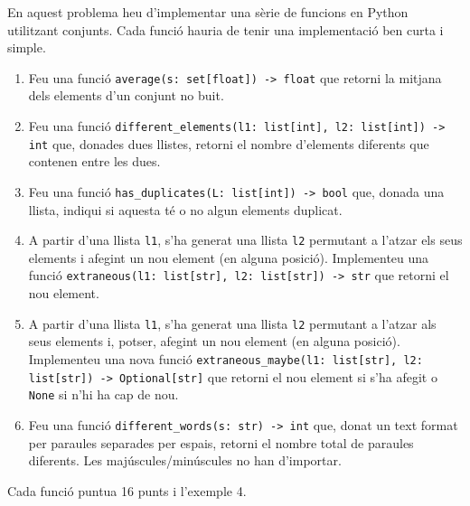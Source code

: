 

\UsePython

\Statement

En aquest problema heu d'implementar una sèrie de funcions en Python utilitzant conjunts. Cada funció hauria de tenir una implementació ben curta i simple.

\begin{enumerate}


\item Feu una funció \lstinline|average(s: set[float]) -> float| que retorni la mitjana dels elements d'un conjunt no buit.
 
\item Feu una funció \lstinline|different_elements(l1: list[int], l2: list[int]) -> int| que, donades dues llistes, retorni el nombre d'elements diferents que contenen entre les dues.
    
\item Feu una funció \lstinline|has_duplicates(L: list[int]) -> bool| que,
donada una llista, indiqui si aquesta té o no algun elements duplicat.

\item A partir d'una llista \lstinline|l1|, s'ha generat una llista \lstinline|l2| permutant a l'atzar els seus elements i afegint un nou element (en alguna posició). Implementeu una funció \linebreak \lstinline|extraneous(l1: list[str], l2: list[str]) -> str| que retorni el nou element.

\item A partir d'una llista \lstinline|l1|, s'ha generat una llista \lstinline|l2| permutant a l'atzar als seus elements i, potser, afegint un nou element (en alguna posició). Implementeu una nova funció \lstinline|extraneous_maybe(l1: list[str], l2: list[str]) -> Optional[str]| que retorni el nou element si s'ha afegit o \texttt{None} si n'hi ha cap de nou.

\item Feu una funció \lstinline|different_words(s: str) -> int| que, donat un text format per paraules separades per espais, retorni el nombre total de paraules diferents. Les majúscules/minúscules no han d'importar.



\end{enumerate}

\Scoring

Cada funció puntua 16 punts i l'exemple 4.

\SampleSession
